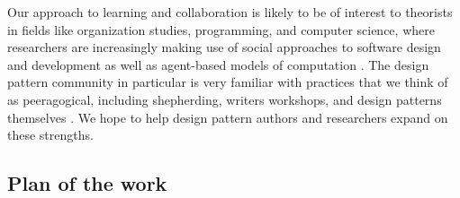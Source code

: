 


Our approach to learning and collaboration is likely to be of interest to theorists in fields like organization studies, programming, and computer science, where researchers are increasingly making use of social approaches to software design and development as well as agent-based models of computation \cite{minsky1967programming,poetry-workshop}.
%
The design pattern community in particular is very familiar with practices that we think of as peeragogical, including shepherding, writers workshops, and design patterns themselves \cite{harrison1999language,coplien1997pattern,meszaros1998pattern}.  We hope to help design pattern authors and researchers expand on these strengths.

\subsection*{Plan of the work}


